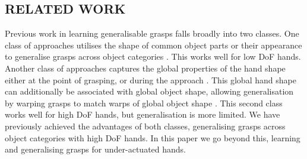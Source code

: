 \subsection{RELATED WORK}
Previous work in learning generalisable grasps falls broadly into two classes. One class of approaches utilises the shape of common object parts or their appearance to generalise grasps across object categories \cite{saxena2008b,detry2013a,herzog2014a, kroemer2012a}. This works well for low DoF hands. Another class of approaches captures the global properties of the hand shape either at the point of grasping, or during the approach \cite{ben2012generalization}. This global hand shape can additionally be associated with global object shape, allowing generalisation by warping grasps to match warps of global object shape \cite{hillenbrand2012transferring}. This second class works well for high DoF hands, but generalisation is more limited. We have previously achieved the advantages of both classes, generalising grasps across object categories with high DoF hands. In this paper we go beyond this, learning and generalising grasps for under-actuated hands. 